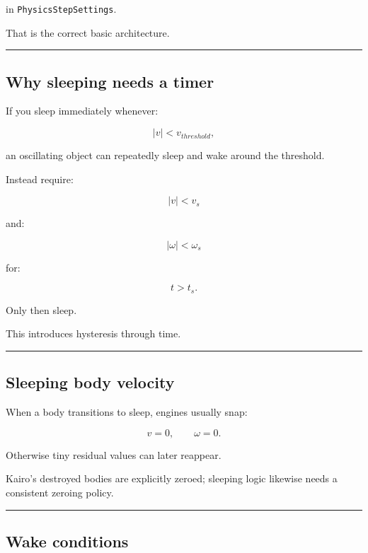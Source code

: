 in \texttt{PhysicsStepSettings}.

That is the correct basic architecture.

\begin{center}\rule{0.5\linewidth}{0.5pt}\end{center}

\subsection{Why sleeping needs a timer}\label{06-engine-ii-ch037-why-sleeping-needs-a-timer}

If you sleep immediately whenever:

\[
|v|<v_{threshold},
\]

an oscillating object can repeatedly sleep and wake around the threshold.

Instead require:

\[
|v|<v_s
\]

and:

\[
|\omega|<\omega_s
\]

for:

\[
t>t_s.
\]

Only then sleep.

This introduces hysteresis through time.

\begin{center}\rule{0.5\linewidth}{0.5pt}\end{center}

\subsection{Sleeping body velocity}\label{06-engine-ii-ch037-sleeping-body-velocity}

When a body transitions to sleep, engines usually snap:

\[
v=0,
\qquad
\omega=0.
\]

Otherwise tiny residual values can later reappear.

Kairo's destroyed bodies are explicitly zeroed; sleeping logic likewise needs a consistent zeroing policy.

\begin{center}\rule{0.5\linewidth}{0.5pt}\end{center}

\subsection{Wake conditions}\label{06-engine-ii-ch037-wake-conditions}

